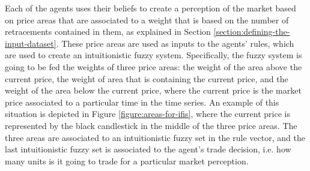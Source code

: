 Each of the agents uses their beliefs to create a perception of the market based
on price areas that are associated to a weight that is based on the number of
retracements contained in them, as explained in Section
\ref{section:defining-the-input-dataset}. These price areas are used as inputs
to the agents' rules, which are used to create an intuitionistic fuzzy
system. Specifically, the fuzzy system is going to be fed the weights of three
price areas: the weight of the area above the current price, the weight of area
that is containing the current price, and the weight of the area below the
current price, where the current price is the market price associated to a
particular time in the time series. An example of this situation is depicted in
Figure \ref{figure:areas-for-ifis}, where the current price is represented by
the black candlestick in the middle of the three price areas. The three areas
are associated to an intuitionistic fuzzy set in the rule vector, and the last
intuitionistic fuzzy set is associated to the agent's trade decision, i.e. how
many units is it going to trade for a particular market perception.


